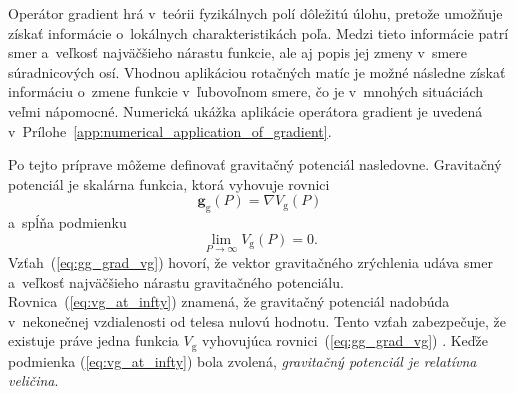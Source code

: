 \documentclass[a4paper,12pt]{book}
\newcommand{\gidx}{\mathrm g}
\let\vec\mathbf
\begin{document}
Operátor gradient hrá v~teórii fyzikálnych polí dôležitú úlohu, pretože 
umožňuje získať informácie o~lokálnych charakteristikách poľa.  Medzi tieto 
informácie patrí smer a~veľkosť najväčšieho nárastu funkcie, ale aj popis jej 
zmeny v~smere súradnicových osí.  Vhodnou aplikáciou rotačných matíc je možné 
následne získať informáciu o~zmene funkcie v~ľubovoľnom smere, čo je v~mnohých 
situáciách veľmi nápomocné.  Numerická ukážka aplikácie operátora gradient je 
uvedená v~Prílohe~\ref{app:numerical_application_of_gradient}.

Po tejto príprave môžeme definovať gravitačný potenciál nasledovne.  Gravitačný
potenciál je skalárna funkcia, ktorá vyhovuje rovnici
\parencite{SansoGeoidDetermination}
%
\begin{equation}
\label{eq:gg_grad_vg}
\vec g_\gidx(P) = \nabla V_\gidx(P)
\end{equation}
%
a~spĺňa podmienku
%
\begin{equation}
\label{eq:vg_at_infty}
\lim_{P \to \infty} V_\gidx(P) = 0{.}
\end{equation}
%
Vzťah~(\ref{eq:gg_grad_vg}) hovorí, že vektor gravitačného zrýchlenia udáva 
smer a~veľkosť najväčšieho nárastu gravitačného potenciálu.  
Rovnica~(\ref{eq:vg_at_infty}) znamená, že gravitačný potenciál nadobúda 
v~nekonečnej vzdialenosti od telesa nulovú hodnotu.  Tento vzťah zabezpečuje, 
že existuje práve jedna funkcia $V_\gidx$ vyhovujúca 
rovnici~(\ref{eq:gg_grad_vg}) \parencite{SansoGeoidDetermination}.  Keďže 
podmienka (\ref{eq:vg_at_infty}) bola zvolená, \emph{gravitačný potenciál je 
relatívna veličina}.
\end{document}
